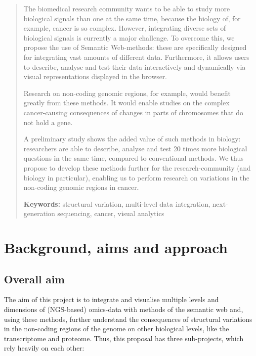 \documentclass[twoside,fontsize=10pt]{article}
\begin{document}
\begin{abstract}\noindent
The biomedical research community wants to be able to study more biological signals than one at the same time, because the biology of, for example, cancer is so complex. However, integrating diverse sets of biological signals is currently a major challenge. To overcome this, we propose the use of Semantic Web-methods: these are specifically designed for integrating vast amounts of different data. Furthermore, it allows users to describe, analyse and test their data interactively and dynamically via visual representations displayed in the browser. 

Research on non-coding genomic regions, for example, would benefit greatly from these methods. It would enable studies on the complex cancer-causing consequences of changes in parts of chromosomes that do not hold a gene.

A preliminary study shows the added value of such methods in biology: researchers are able to describe, analyse and test 20 times more biological questions in the same time, compared to conventional methods. We thus propose to develop these methods further for the research-community (and biology in particular), enabling us to perform research on variations in the non-coding genomic regions in cancer. \\
\medskip

\noindent \textbf{Keywords:} structural variation, multi-level data integration, next-generation sequencing, cancer, visual analytics
\end{abstract}



\newpage
\section*{Background, aims and approach}
\subsection*{Overall aim}
The aim of this project is to integrate and visualise multiple levels and dimensions of (NGS-based) omics-data with methods of the semantic web and, using these methods, further understand the consequences of structural variations in the non-coding regions of the genome on other biological levels, like the transcriptome and proteome. Thus, this proposal has three sub-projects, which rely heavily on each other:
\end{document}
